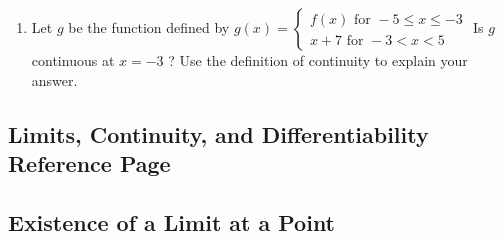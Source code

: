\documentclass[
]{article}
\providecommand{\tightlist}{%
  \setlength{\itemsep}{0pt}\setlength{\parskip}{0pt}}
\begin{document}
\begin{enumerate}
  \begin{enumerate}
  \def\labelenumii{(\alph{enumii})}
  \tightlist
  \item
    Let \(g\) be the function defined by
    \(g(x)=\left\{\begin{array}{l}f(x) \text { for }-5 \leq x \leq-3 \\ x+7 \text { for }-3<x<5\end{array}\right.\)
    Is \(g\) continuous at \(x=-3\) ? Use the definition of continuity
    to explain your answer.
  \end{enumerate}
\end{enumerate}

\subsection{Limits, Continuity, and Differentiability Reference
Page}\label{limits-continuity-and-differentiability-reference-page}

\subsection{Existence of a Limit at a
Point}\label{existence-of-a-limit-at-a-point}
\end{document}
